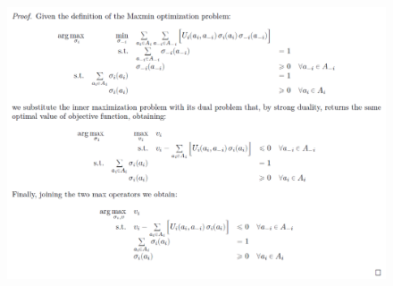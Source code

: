 \begin{figure}[H]
\centering
\includegraphics[width=\textwidth]{images/img_2_7_03.png}
\end{figure}
